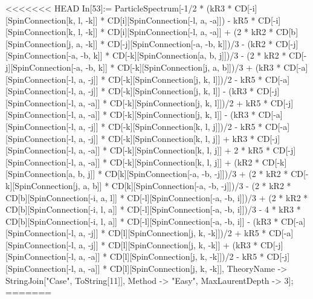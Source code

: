 <<<<<<< HEAD
In[53]:= ParticleSpectrum[-1/2 * (kR3 * CD[-i][SpinConnection[k, l, -k]] * CD[i][SpinConnection[-l, a, -a]]) - kR5 * CD[-i][SpinConnection[k, l, -k]] * CD[i][SpinConnection[-l, a, -a]] + (2 * kR2 * CD[b][SpinConnection[j, a, -k]] * CD[-j][SpinConnection[-a, -b, k]])/3 - (kR2 * CD[-j][SpinConnection[-a, -b, k]] * CD[-k][SpinConnection[a, b, j]])/3 - (2 * kR2 * CD[-j][SpinConnection[-a, -b, k]] * CD[-k][SpinConnection[j, a, b]])/3 + (kR3 * CD[-a][SpinConnection[-l, a, -j]] * CD[-k][SpinConnection[j, k, l]])/2 - kR5 * CD[-a][SpinConnection[-l, a, -j]] * CD[-k][SpinConnection[j, k, l]] - (kR3 * CD[-j][SpinConnection[-l, a, -a]] * CD[-k][SpinConnection[j, k, l]])/2 + kR5 * CD[-j][SpinConnection[-l, a, -a]] * CD[-k][SpinConnection[j, k, l]] - (kR3 * CD[-a][SpinConnection[-l, a, -j]] * CD[-k][SpinConnection[k, l, j]])/2 - kR5 * CD[-a][SpinConnection[-l, a, -j]] * CD[-k][SpinConnection[k, l, j]] + kR3 * CD[-j][SpinConnection[-l, a, -a]] * CD[-k][SpinConnection[k, l, j]] + 2 * kR5 * CD[-j][SpinConnection[-l, a, -a]] * CD[-k][SpinConnection[k, l, j]] + (kR2 * CD[-k][SpinConnection[a, b, j]] * CD[k][SpinConnection[-a, -b, -j]])/3 + (2 * kR2 * CD[-k][SpinConnection[j, a, b]] * CD[k][SpinConnection[-a, -b, -j]])/3 - (2 * kR2 * CD[b][SpinConnection[-i, a, l]] * CD[-l][SpinConnection[-a, -b, i]])/3 + (2 * kR2 * CD[b][SpinConnection[-i, l, a]] * CD[-l][SpinConnection[-a, -b, i]])/3 - 4 * kR3 * CD[b][SpinConnection[-i, l, a]] * CD[-l][SpinConnection[-a, -b, i]] - (kR3 * CD[-a][SpinConnection[-l, a, -j]] * CD[l][SpinConnection[j, k, -k]])/2 + kR5 * CD[-a][SpinConnection[-l, a, -j]] * CD[l][SpinConnection[j, k, -k]] + (kR3 * CD[-j][SpinConnection[-l, a, -a]] * CD[l][SpinConnection[j, k, -k]])/2 - kR5 * CD[-j][SpinConnection[-l, a, -a]] * CD[l][SpinConnection[j, k, -k]], TheoryName -> StringJoin["Case", ToString[11]], Method -> "Easy", MaxLaurentDepth -> 3]; 
=======

